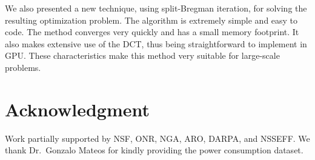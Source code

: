 \documentclass[preprint]{imsart}
\begin{document}
We also presented a new technique, using split-Bregman iteration, for solving the resulting optimization problem. The algorithm is extremely simple and easy to code. The method converges very quickly and has a small memory footprint. It also makes extensive use of the DCT, thus being straightforward to implement in GPU. These characteristics make this method very suitable for large-scale problems.

\section*{Acknowledgment}

Work partially supported by NSF, ONR, NGA, ARO, DARPA, and NSSEFF.
We thank Dr.~Gonzalo Mateos for kindly providing the power consumption dataset.



\end{document}
